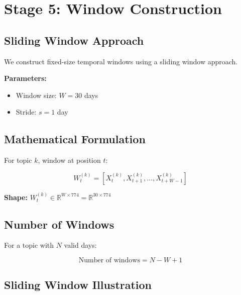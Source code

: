 \documentclass[12pt]{article}
\begin{document}
\newpage

\section{Stage 5: Window Construction}

\subsection{Sliding Window Approach}

We construct fixed-size temporal windows using a sliding window approach.

\textbf{Parameters:}
\begin{itemize}
    \item Window size: $W = 30$ days
    \item Stride: $s = 1$ day
\end{itemize}

\subsection{Mathematical Formulation}

For topic $k$, window at position $t$:

\begin{equation}
W_t^{(k)} = [X_t^{(k)}, X_{t+1}^{(k)}, ..., X_{t+W-1}^{(k)}]
\end{equation}

\textbf{Shape:} $W_t^{(k)} \in \mathbb{R}^{W \times 774} = \mathbb{R}^{30 \times 774}$

\subsection{Number of Windows}

For a topic with $N$ valid days:

\begin{equation}
\text{Number of windows} = N - W + 1
\end{equation}

\subsection{Sliding Window Illustration}
\end{document}
